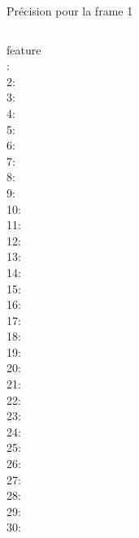 \documentclass{bredelebeamer}
\begin{document}
\begin{frame}{Précision pour la frame 1}

\begin{columns}

\begin{column}{0.2\textwidth}
\begin{tcolorbox}[tabgris,tabularx={|Y|}, boxrule=0.5pt, fontupper=\tiny, fontlower=\tiny, title=FRAME 1]
feature\\\hline{}:\\
2:\\
3:\\
4:\\
5:\\
6:\\
7:\\
8:\\
9:\\
10:\\
11:\\
12:\\
13:\\
14:\\
15:\\
16:\\
17:\\
18:\\
19:\\
20:\\
21:\\
22:\\
23:\\
24:\\
25:\\
26:\\
27:\\
28:\\
29:\\
30:\\
\end{tcolorbox}
\end{column}


\end{columns}
\end{frame}
\end{document}
